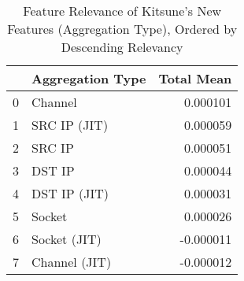 \begin{table}
\caption{Feature Relevance of Kitsune's New Features (Aggregation Type), Ordered by Descending Relevancy}
\label{tab:shap-orig-feat}
\begin{tabular}{llr}
\toprule
 & Aggregation Type & Total Mean \\
\midrule
0 & Channel & 0.000101 \\
1 & SRC IP (JIT) & 0.000059 \\
2 & SRC IP & 0.000051 \\
3 & DST IP & 0.000044 \\
4 & DST IP (JIT) & 0.000031 \\
5 & Socket & 0.000026 \\
6 & Socket (JIT) & -0.000011 \\
7 & Channel (JIT) & -0.000012 \\
\bottomrule
\end{tabular}
\end{table}

